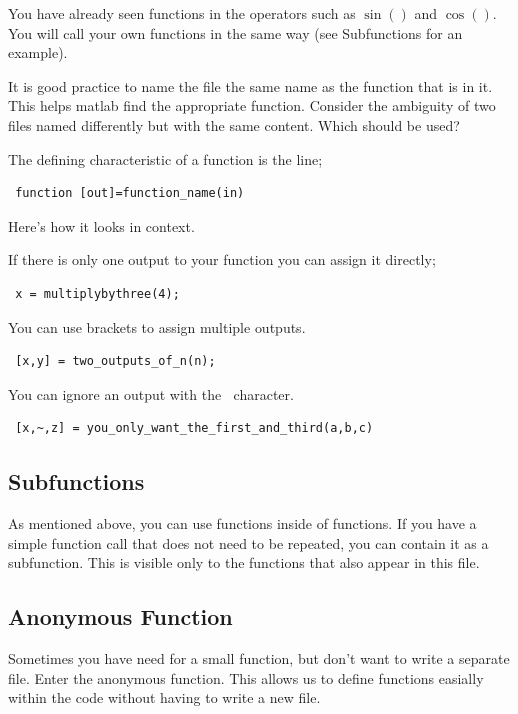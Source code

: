 You have already seen functions in the operators such as $\sin()$ and $\cos()$.
 You will call your own functions in the same way (see Subfunctions for an example).
 
It is good practice to name the file the same name as the function that is in it.
 This helps matlab find the appropriate function.
 Consider the ambiguity of two files named differently but with the same content.
 Which should be used?

The defining characteristic of a function is the line;
\begin{verbatim}
 function [out]=function_name(in)
\end{verbatim}

Here's how it looks in context.
\begin{quote}

\end{quote}

If there is only one output to your function you can assign it directly;
\begin{verbatim}
 x = multiplybythree(4);
\end{verbatim}

You can use brackets to assign multiple outputs.
\begin{verbatim}
 [x,y] = two_outputs_of_n(n);
\end{verbatim}

You can ignore an output with the $~$ character.
\begin{verbatim}
 [x,~,z] = you_only_want_the_first_and_third(a,b,c)
\end{verbatim}

\pagebreak
\subsection{Subfunctions}
As mentioned above, you can use functions inside of functions.
 If you have a simple function call that does not need to be repeated, you can contain it as a subfunction.
 This is visible only to the functions that also appear in this file.

\begin{quote}

\end{quote}

\pagebreak
\subsection{Anonymous Function}
Sometimes you have need for a small function, but don't want to write a separate file.
 Enter the anonymous function.
 This allows us to define functions easially within the code without having to write a new file.

